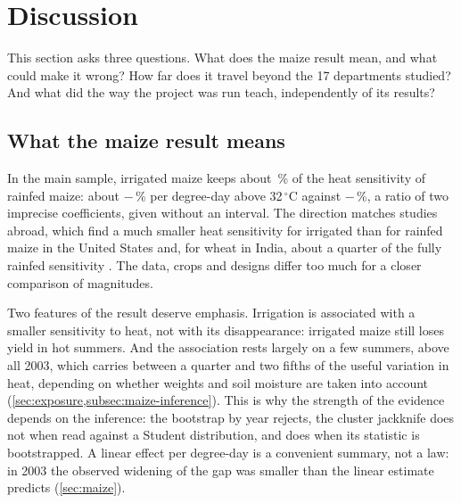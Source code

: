 \section{Discussion}
\label{sec:discussion}

This section asks three questions. What does the maize result mean, and what could make it wrong? How far does it travel beyond the 17 departments studied? And what did the way the project was run teach, independently of its results?

\subsection{What the maize result means}

In the main sample, irrigated maize keeps about \IrrShareOfRainfedSens\,\% of the heat sensitivity of rainfed maize: about $-$\QoneIrrigatedPct\,\% per degree-day above 32\,$^{\circ}$C against $-$\QoneRainfedPct\,\%, a ratio of two imprecise coefficients, given without an interval. The direction matches studies abroad, which find a much smaller heat sensitivity for irrigated than for rainfed maize in the United States \parencite{schauberger2017} and, for wheat in India, about a quarter of the fully rainfed sensitivity \parencite{zaveri2019}. The data, crops and designs differ too much for a closer comparison of magnitudes.

Two features of the result deserve emphasis. Irrigation is associated with a smaller sensitivity to heat, not with its disappearance: irrigated maize still loses yield in hot summers. And the association rests largely on a few summers, above all 2003, which carries between a quarter and two fifths of the useful variation in heat, depending on whether weights and soil moisture are taken into account (\cref{sec:exposure,subsec:maize-inference}). This is why the strength of the evidence depends on the inference: the bootstrap by year rejects, the cluster jackknife does not when read against a Student distribution, and does when its statistic is bootstrapped. A linear effect per degree-day is a convenient summary, not a law: in 2003 the observed widening of the gap was smaller than the linear estimate predicts (\cref{sec:maize}).

